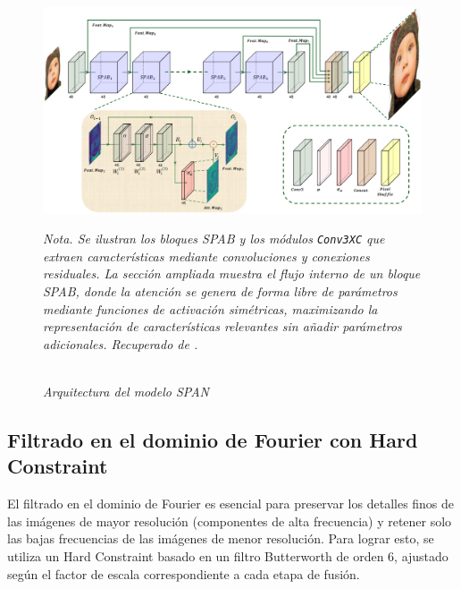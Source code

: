        \begin{figure}[H] 
            \caption{\doublespacing \\ \textit{Arquitectura del modelo SPAN}} 
            \centering
            \includegraphics[width=1\linewidth]{images/span.png}
            \begin{justify}
                \textit{Nota. Se ilustran los bloques SPAB y los módulos \texttt{Conv3XC} que extraen características mediante convoluciones y conexiones residuales. La sección ampliada muestra el flujo interno de un bloque SPAB, donde la atención se genera de forma libre de parámetros mediante funciones de activación simétricas, maximizando la representación de características relevantes sin añadir parámetros adicionales. Recuperado de \textcite{wan2024swiftparameterfreeattentionnetwork}.} 
            \end{justify}                    
            \label{fig:span}
        \end{figure}      
       
    \subsection{Filtrado en el dominio de Fourier con Hard Constraint}

        El filtrado en el dominio de Fourier es esencial para preservar los detalles finos de las imágenes de mayor resolución (componentes de alta frecuencia) y retener solo las bajas frecuencias de las imágenes de menor resolución. Para lograr esto, se utiliza un Hard Constraint basado en un filtro Butterworth de orden 6, ajustado según el factor de escala correspondiente a cada etapa de fusión.

